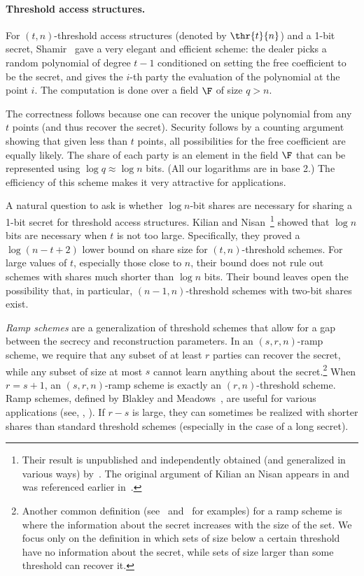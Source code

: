\documentclass{toc}
\begin{document}
\paragraph{Threshold access structures.} For $(t,n)$-threshold access
structures (denoted by $\thr{t}{n}$) and a 1-bit secret, Shamir~\cite{Shamir79} gave a very elegant
and efficient scheme: the dealer picks a random polynomial of degree $t-1$
conditioned on setting the free coefficient to be the secret, and gives the
$i$-th party the evaluation of the polynomial at the point $i$. The computation
is done over a field $\F$ of size $q>n$.

The correctness follows because one can recover the unique polynomial from any
$t$ points (and thus recover the secret). Security follows by a counting
argument showing that given less than $t$ points, all possibilities for the free
coefficient are equally likely. The share of each party is an element in the
field $\F$ that can be represented using $\log q\approx \log n$ bits. (All our
logarithms are in base 2.) The efficiency of this scheme makes it very attractive
for applications.

A natural question to ask is whether $\log{n}$-bit shares are necessary
for sharing a 1-bit secret for threshold access structures. Kilian and
Nisan~\cite{KilianN90}\footnote{Their result is unpublished and independently
	obtained (and generalized in various ways) by~\cite{PueyoCX13}. The original
	argument of Kilian an Nisan appears in \cite[Appendix A]{PueyoCX13} and was
	referenced earlier in~\cite{BeimelC94,BeimelPHD,BeimelF07}.}  showed that
$\log n$ bits are necessary when $t$ is not too large. Specifically, they proved
a $\log(n-t+2)$ lower bound on share size for $(t,n)$-threshold
schemes.  For large values of $t$, especially those close to $n$, their
bound does not rule out schemes with shares much shorter than $\log n$ bits. Their
bound leaves open the possibility that, in particular, $(n-1,n)$-threshold schemes
with two-bit shares exist.  


\emph{Ramp schemes} are a generalization of threshold schemes that allow for a 
gap between the secrecy and reconstruction parameters. In an $(s,r,n)$-ramp scheme, we
require that any subset of at least $r$ parties can recover the secret, while
any subset of size at most $s$ cannot learn anything about the
secret.\footnote{Another common definition (see~\cite[Definition 2.7]{FarrasHKP14} and~\cite[Example 2.11]{MolleviMP16} for examples) for a ramp scheme is where the
	information about the secret increases with the size of the set. 
We focus only
on the definition in which sets of size below a certain threshold have no
information about the secret, while sets of size larger than some threshold
can recover it.}  When $r=s+1$, an $(s,r,n)$-ramp scheme is exactly an
$(r,n)$-threshold scheme. Ramp schemes, defined by Blakley and
Meadows~\cite{BlakleyM84}, are useful for various applications (see,
\eg, \cite{FranklinY92,StinsonW99,ChenC06,MartinPS11}). If $r-s$ is large, they
can sometimes be realized with shorter shares than standard threshold schemes
(especially in the case of a long secret).
\end{document}
